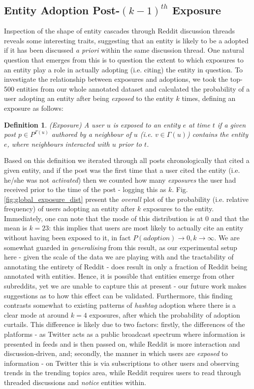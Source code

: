 \documentclass[10pt,journal,compsoc]{IEEEtran}
\newtheorem{mydef}{Definition}
\begin{document}
\subsection{Entity Adoption Post-$({k-1})^{th}$ Exposure}
Inspection of the shape of entity cascades through Reddit discussion threads reveals some interesting traits, suggesting that an entity is likely to be a adopted if it has been discussed \emph{a priori} within the same discussion thread.
One natural question that emerges from this is to question the extent to which exposures to an entity play a role in actually adopting (i.e. citing) the entity in question.
To investigate the relationship between exposures and adoptions, we took the top-500 entities from our whole annotated dataset and calculated the probability of a user adopting an entity after being \emph{exposed} to the entity $k$ times, defining an exposure as follows:

\begin{mydef}
\label{def:exposure}
(Exposure) A user $u$ is exposed to an entity $e$ at time $t$ if a given post $p \in P^{\Gamma(u)}$ authored by a neighbour of $u$ (i.e. $v \in \Gamma(u)$) contains the entity $e$, where neighbours interacted with $u$ prior to $t$.
\end{mydef}

Based on this definition we iterated through all posts chronologically that cited a given entity, and if the post was the first time that a user cited the entity (i.e. he/she was not \emph{activated}) then we counted how many \emph{exposures} the user had received prior to the time of the post - logging this as $k$.
Fig. \ref{fig:global_exposure_dist} present the \emph{overall} plot of the probability (i.e. relative frequency) of users adopting an entity after $k$ exposures to the entity.
Immediately, one can note that the mode of this distribution is at $0$ and that the mean is $k=23$: this implies that users are most likely to actually cite an entity without having been exposed to it, in fact $P(adoption) \rightarrow 0, k \rightarrow \infty$.
We are somewhat guarded in \emph{generalising} from this result, as our experimental setup here - given the scale of the data we are playing with and the tractability of annotating the entirety of Reddit - does result in only a fraction of Reddit being annotated with entities.
Hence, it is possible that entities emerge from other subreddits, yet we are unable to capture this at present - our future work makes suggestions as to how this effect can be validated.
Furthermore, this finding contrasts somewhat to existing patterns of \emph{hashtag} adoption \cite{romero2011differences} where there is a clear mode at around $k=4$ exposures, after which the probability of adoption curtails.
This difference is likely due to two factors: firstly, the differences of the platforms - as Twitter acts as a public broadcast spectrum where information is presented in feeds and is then passed on, while Reddit is more interaction and discussion-driven, and; secondly, the manner in which users are \emph{exposed} to information - on Twitter this is via subscriptions to other users and observing trends in the trending topics area, while Reddit requires users to read through threaded discussions and \emph{notice} entities within.
\end{document}
